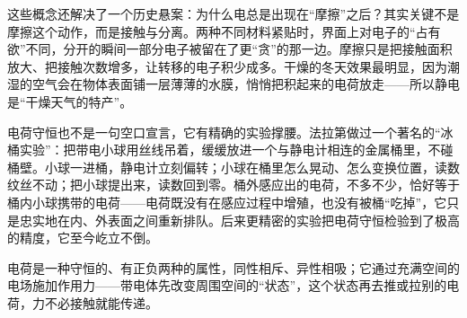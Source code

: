 \begin{mainline}
这些概念还解决了一个历史悬案：为什么电总是出现在“摩擦”之后？其实关键不是摩擦这个动作，而是接触与分离。两种不同材料紧贴时，界面上对电子的“占有欲”不同，分开的瞬间一部分电子被留在了更“贪”的那一边。摩擦只是把接触面积放大、把接触次数增多，让转移的电子积少成多。干燥的冬天效果最明显，因为潮湿的空气会在物体表面铺一层薄薄的水膜，悄悄把积起来的电荷放走——所以静电是“干燥天气的特产”。

电荷守恒也不是一句空口宣言，它有精确的实验撑腰。法拉第做过一个著名的“冰桶实验”：把带电小球用丝线吊着，缓缓放进一个与静电计相连的金属桶里，不碰桶壁。小球一进桶，静电计立刻偏转；小球在桶里怎么晃动、怎么变换位置，读数纹丝不动；把小球提出来，读数回到零。桶外感应出的电荷，不多不少，恰好等于桶内小球携带的电荷——电荷既没有在感应过程中增殖，也没有被桶“吃掉”，它只是忠实地在内、外表面之间重新排队。后来更精密的实验把电荷守恒检验到了极高的精度，它至今屹立不倒。
\end{mainline}


\begin{oneline}
电荷是一种守恒的、有正负两种的属性，同性相斥、异性相吸；它通过充满空间的电场施加作用力——带电体先改变周围空间的“状态”，这个状态再去推或拉别的电荷，力不必接触就能传递。
\end{oneline}


